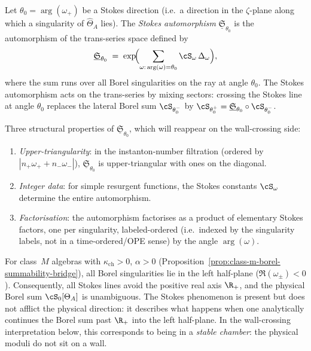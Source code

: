 \begin{definition}
\label{def:stokes-automorphism}
%
Let $\theta_0 = \arg(\omega_+)$ be a Stokes direction \textup{(}i.e.\ a direction in the $\zeta$-plane along which a singularity of $\hat{\Theta}_A$ lies\textup{)}. The \emph{Stokes automorphism} $\underline{\mathfrak{S}}_{\theta_0}$ is the automorphism of the trans-series space defined by
\[
 \underline{\mathfrak{S}}_{\theta_0} \;=\; \exp\!\Bigl(\sum_{\omega:\, \arg(\omega) = \theta_0} \cS_\omega\, \Delta_\omega\Bigr),
\]
where the sum runs over all Borel singularities on the ray at angle $\theta_0$. The Stokes automorphism acts on the trans-series by mixing sectors: crossing the Stokes line at angle $\theta_0$ replaces the lateral Borel sum $\cS_{\theta_0^-}$ by $\cS_{\theta_0^+} = \underline{\mathfrak{S}}_{\theta_0} \circ \cS_{\theta_0^-}$.

Three structural properties of $\underline{\mathfrak{S}}_{\theta_0}$, which will reappear on the wall-crossing side:
\begin{enumerate}[label=\textup{(\alph*)}]
 \item \emph{Upper-triangularity}: in the instanton-number filtration (ordered by $|n_+ \omega_+ + n_- \omega_-|$), $\underline{\mathfrak{S}}_{\theta_0}$ is upper-triangular with ones on the diagonal.
 \item \emph{Integer data}: for simple resurgent functions, the Stokes constants $\cS_\omega$ determine the entire automorphism.
 \item \emph{Factorisation}: the automorphism factorises as a product of elementary Stokes factors, one per singularity, labeled-ordered (i.e.\ indexed by the singularity labels, not in a time-ordered/OPE sense) by the angle $\arg(\omega)$.
\end{enumerate}
\end{definition}

\begin{remark}
\label{rem:stokes-lhp}
For class~$M$ algebras with $\kappa_{\mathrm{ch}} > 0$, $\alpha > 0$ (Proposition~\ref{prop:class-m-borel-summability-bridge}), all Borel singularities lie in the left half-plane ($\Re(\omega_\pm) < 0$). Consequently, all Stokes lines avoid the positive real axis $\R_+$, and the physical Borel sum $\cS_0[\Theta_A]$ is unambiguous. The Stokes phenomenon is present but does not afflict the physical direction: it describes what happens when one analytically continues the Borel sum past $\R_+$ into the left half-plane. In the wall-crossing interpretation below, this corresponds to being in a \emph{stable chamber}: the physical moduli do not sit on a wall.
\end{remark}

